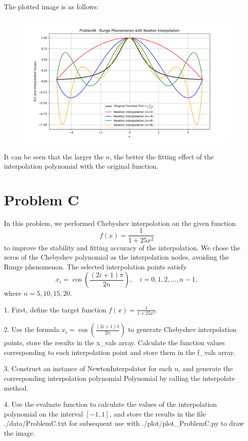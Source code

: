 \documentclass[a4paper]{article}
\begin{document}
The plotted image is as follows:
\begin{figure}[h]
    \centering
    \includegraphics[width=0.75\linewidth]{Pictures/ProblemB_figure.png}
    
\end{figure}

It can be seen that the larger the \( n \), the better the fitting effect of the interpolation polynomial with the original function.

\newpage
\section*{Problem C}

In this problem, we performed Chebyshev interpolation on the given function 
\[
f(x) = \frac{1}{1 + 25x^2}
\]
to improve the stability and fitting accuracy of the interpolation. We chose the zeros of the Chebyshev polynomial as the interpolation nodes, avoiding the Runge phenomenon. The selected interpolation points satisfy
\[
x_i = \cos \left( \frac{(2i + 1) \pi}{2n} \right), \quad i = 0, 1, 2, \ldots, n - 1,
\]
where \( n = 5, 10, 15, 20 \).

1. First, define the target function \( f(x) = \frac{1}{1 + 25 x^2} \).

2. Use the formula \( x_i = \cos \left( \frac{(2i + 1) \pi}{2n} \right) \) to generate Chebyshev interpolation points, store the results in the x\_vals array. Calculate the function values corresponding to each interpolation point and store them in the f\_vals array.

3. Construct an instance of NewtonInterpolator for each \( n \), and generate the corresponding interpolation polynomial Polynomial by calling the interpolate method.

4. Use the evaluate function to calculate the values of the interpolation polynomial on the interval \([-1, 1]\), and store the results in the file ./data/ProblemC.txt for subsequent use with ./plot/plot\_ProblemC.py to draw the image.
\end{document}
